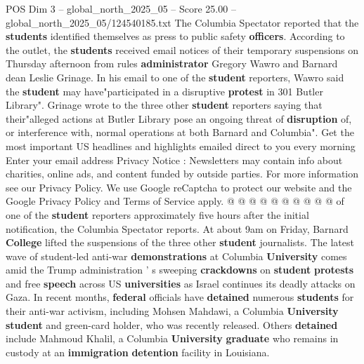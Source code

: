 \begin{textsample}{POS Dim 3 – global\_north\_2025\_05 – Score 25.00 – global\_north\_2025\_05/124540185.txt}
The Columbia Spectator reported that the \textbf{students} identified themselves as press to public safety \textbf{officers}.
According to the outlet, the \textbf{students} received email notices of their temporary suspensions on Thursday afternoon from rules \textbf{administrator} Gregory Wawro and Barnard dean Leslie Grinage.
In his email to one of the \textbf{student} reporters, Wawro said the \textbf{student} may have"participated in a disruptive \textbf{protest} in 301 Butler Library".
Grinage wrote to the three other \textbf{student} reporters saying that their"alleged actions at Butler Library pose an ongoing threat of \textbf{disruption} of, or interference with, normal operations at both Barnard and Columbia".
Get the most important US headlines and highlights emailed direct to you every morning Enter your email address Privacy Notice : Newsletters may contain info about charities, online ads, and content funded by outside parties.
For more information see our Privacy Policy.
We use Google reCaptcha to protect our website and the Google Privacy Policy and Terms of Service apply. @ @ @ @ @ @ @ @ @ @ of one of the \textbf{student} reporters approximately five hours after the initial notification, the Columbia Spectator reports.
At about 9am on Friday, Barnard \textbf{College} lifted the suspensions of the three other \textbf{student} journalists.
The latest wave of student-led anti-war \textbf{demonstrations} at Columbia \textbf{University} comes amid the Trump administration ' s sweeping \textbf{crackdowns} on \textbf{student} \textbf{protests} and free \textbf{speech} across US \textbf{universities} as Israel continues its deadly attacks on Gaza.
In recent months, \textbf{federal} officials have \textbf{detained} numerous \textbf{students} for their anti-war activism, including Mohsen Mahdawi, a Columbia \textbf{University} \textbf{student} and green-card holder, who was recently released.
Others \textbf{detained} include Mahmoud Khalil, a Columbia \textbf{University} \textbf{graduate} who remains in custody at an \textbf{immigration} \textbf{detention} facility in Louisiana.

\end{textsample}
